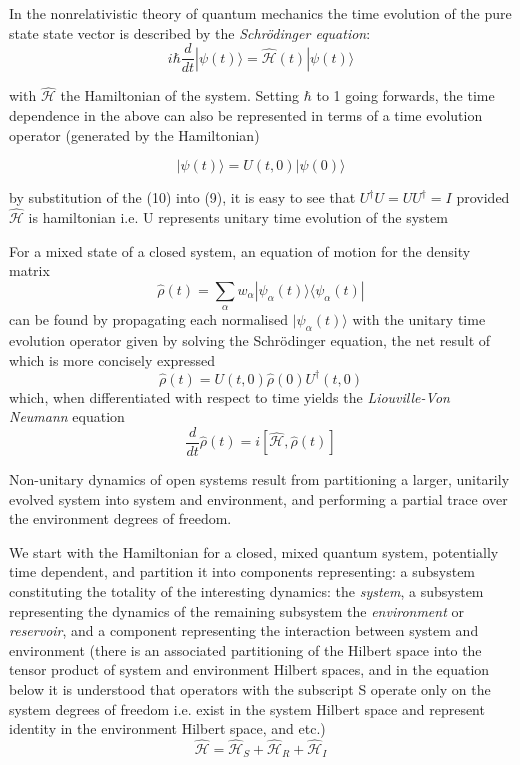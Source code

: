 \documentclass[reqno]{amsart}
\newcommand{\ham}{\hat{\mathscr{H}}}
\newcommand{\dens}{\hat{\rho}}
\begin{document}
In the nonrelativistic theory of quantum mechanics the time evolution of the pure state state vector is described by the \emph{Schr\"odinger equation}:
\begin{equation}
	i\hbar \frac{d}{dt} |\psi(t)\rangle = \ham(t) |\psi(t) \rangle
\end{equation}

with $\ham$ the Hamiltonian of the system. Setting $\hbar$ to 1 going forwards, the time dependence in the above can also be represented in terms of a time evolution operator (generated by the Hamiltonian) 

\begin{equation}
	|\psi(t) \rangle = U(t, 0) | \psi(0) \rangle
\end{equation}

by substitution of the (10) into (9), it is easy to see that $U^{\dagger}U = UU^\dagger = I$ provided $\ham$ is hamiltonian i.e. U represents unitary time evolution of the system

For a mixed state of a closed system, an equation of motion for the density matrix
\begin{equation}
	\dens (t) = \sum_\alpha w_{\alpha} |\psi_\alpha (t) \rangle \langle \psi_\alpha (t) |
\end{equation}
can be found by propagating each normalised $| \psi_\alpha (t) \rangle$ with the unitary time evolution operator given by solving the Schr\"odinger equation, the net result of which is more concisely expressed
\begin{equation}
	\dens (t) = U(t, 0)\dens (0) U^\dagger (t, 0)
\end{equation}
which, when differentiated with respect to time yields the \emph{Liouville-Von Neumann} equation
\begin{equation}
	\frac{d}{dt}\dens(t) = i [\ham, \dens (t) ]
\end{equation}

Non-unitary dynamics of open systems result from partitioning a larger, unitarily evolved system into system and environment, and performing a partial trace over the environment degrees of freedom.

We start with the Hamiltonian for a closed, mixed quantum system, potentially time dependent, and partition it into components representing: a subsystem constituting the totality of the interesting dynamics: the \emph{system}, a subsystem representing the dynamics of the remaining subsystem the \emph{environment} or \emph{reservoir}, and a component representing the interaction between system and environment (there is an associated partitioning of the Hilbert space into the tensor product of system and environment Hilbert spaces, and in the equation below it is understood that operators with the subscript S operate only on the system degrees of freedom i.e. exist in the system Hilbert space and represent identity in the environment Hilbert space, and etc.)
\begin{equation}
	\ham = \ham_S +\ham_R + \ham_I
\end{equation}
\end{document}
